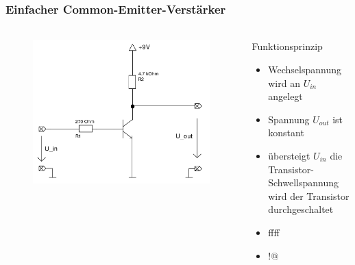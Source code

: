 \begin{frame}
    \frametitle{Einfacher Common-Emitter-Verstärker}
    \framesubtitle{}
     \begin{columns}[c]
        \begin{figure}[H]
        \begin{center}
                \includegraphics[scale=0.16]{./img/schaltungen/common_emitter_einfach.png}
        \end{center}
        \end{figure}
         \begin{block}{Funktionsprinzip}
            \begin{itemize}
                \item Wechselspannung wird an $U_{in}$ angelegt
                \item Spannung $U_{out}$ ist konstant
                \item übersteigt $U_{in}$ die Transistor-Schwellspannung wird
                der Transistor durchgeschaltet
                \item ffff
                \item $!@$
            \end{itemize}    
         \end{block}
     \end{columns}

\end{frame}
